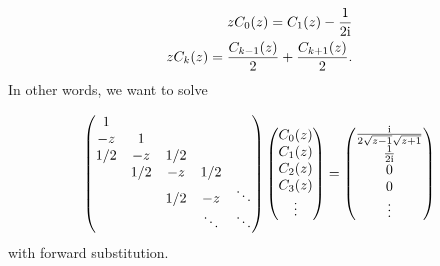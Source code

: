 \documentclass[12pt,a4paper]{article}
\def\I{ {\rm i} }
\def\C{ {\mathbb C} }
\begin{document}
\begin{align*}
z C_0(z) = C_1(z) -  {1  \over 2 \I} \\
z C_k(z) = {C_{k-1}(z) \over 2} +{C_{k+1}(z) \over 2} .
\end{align*}
In other words, we want to solve

\[
\begin{pmatrix}
1 \\
-z & 1 \\
1/2 & -z & 1/2 \\
&1/2 & -z & 1/2 \\
&& 1/2 & -z &\ddots\\
&&&\ddots & \ddots
\end{pmatrix}\begin{pmatrix}C_0(z) \\C_1(z) \\C_2(z) \\C_3(z) \\ \vdots \end{pmatrix} = \begin{pmatrix} { \I \over 2\sqrt{z-1}\sqrt{z+1}} \\{1 \over 2 \I} \\0 \\0 \\ \vdots \end{pmatrix}
\]
with forward substitution.
\end{document}
